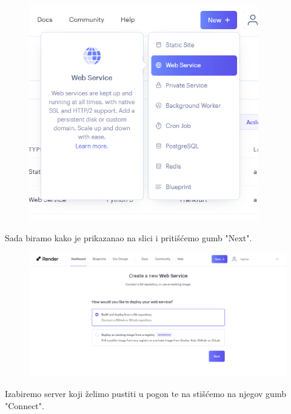 				\begin{figure}[htb]
					\centering
					\includegraphics[width=10cm]{slike/back_2.png}
					\label{fig:fer-logo}
				\end{figure}
				\newpage
				\text{}Sada biramo kako je prikazanao na slici i pritišćemo gumb "Next".
				
				\begin{figure}[htb]
					\centering
					\includegraphics[width=15cm]{slike/back_3.png}
					\label{fig:fer-logo}
				\end{figure}
				\newpage
				\text{}Izabiremo server koji želimo pustiti u pogon te na stišćemo na njegov gumb "Connect".
				
